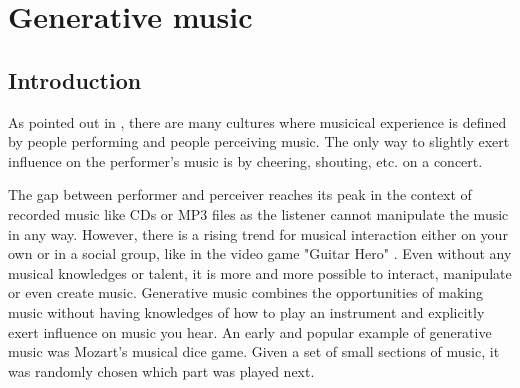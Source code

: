 	 

	\section{Generative music}
	

	\subsection{Introduction}
	As pointed out in \cite{Chandra2012}, there are many cultures where musicical experience is defined by people performing and people perceiving music. 
	The only way to slightly exert influence on the performer's music is by cheering, shouting, etc. on a concert. 
	
	The gap between performer and perceiver reaches its peak in the context of recorded music like CDs or MP3 files as the listener cannot manipulate the music in any way. 
	However, there is a rising trend for musical interaction either on your own or in a social group, like in the video game "Guitar Hero" \cite{Chandra2012, Planck2009}. 
	Even without any musical knowledges or talent, it is more and more possible to interact, manipulate or even create music.
	Generative music combines the opportunities of making music without having knowledges of how to play an instrument and explicitly exert influence on music you hear.
	An early and popular example of generative music was Mozart's musical dice game. Given a set of small sections of music, it was randomly chosen which part was played next.


